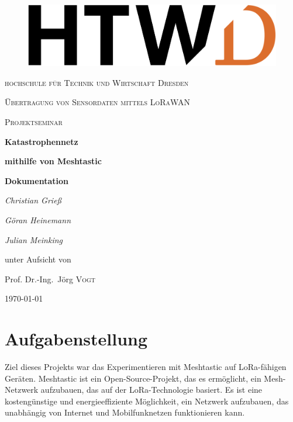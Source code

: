 \documentclass[12pt,a4paper]{article}
\author{Christian Grieß}
\begin{document}
\begin{titlepage}
\begin{figure}
	\centering \includegraphics[scale=0.5]{./Bilder/HTWLogo/HTWD.png}
\end{figure}

	
	\centering
	{\scshape\LARGE hochschule für Technik und Wirtschaft Dresden \par}
	\vspace{2cm}
	{\scshape\Large Übertragung von Sensordaten mittels LoRaWAN\par}
	\vspace{0cm}
	{\scshape\Large Projektseminar \par}
	\vspace{1.5cm}
	{\huge\bfseries Katastrophennetz\par}
	{\huge\bfseries mithilfe von Meshtastic\par}
	\vspace{1.5cm}
	{\huge\bfseries {Dokumentation}\par}	
	\vspace{4cm}
	{\Large\itshape Christian Grieß\par}
	{\Large\itshape Göran Heinemann\par}
	{\Large\itshape Julian Meinking\par}
	\vfill
	unter Aufsicht von\par %
	Prof. Dr.-Ing.~Jörg \textsc{Vogt}

	\vfill

	{\large \today\par}
\end{titlepage}
\newpage
\tableofcontents

\newpage
\section{Aufgabenstellung}

Ziel dieses Projekts war das Experimentieren mit Meshtastic auf LoRa-fähigen Geräten.
Meshtastic ist ein Open-Source-Projekt, das es ermöglicht, ein Mesh-Netzwerk aufzubauen, das auf der LoRa-Technologie basiert. Es ist eine kostengünstige und energieeffiziente Möglichkeit, ein Netzwerk aufzubauen, das unabhängig von Internet und Mobilfunknetzen funktionieren kann.
\end{document}
